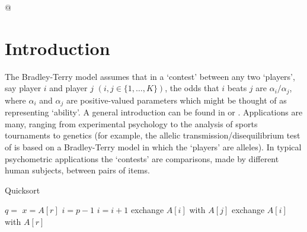 


@

\Rcodeplaceholder{}


\section{Introduction}

The Bradley-Terry model \citep{brad:terr:52} assumes that in a `contest' between
any two `players', say player $i$ and player $j$ $(i, j \in \{1,\ldots,K\})$,
the odds that $i$ beats $j$ are $\alpha_i/\alpha_j$, where $\alpha_i$ and
$\alpha_j$ are positive-valued parameters which might be thought of as
representing `ability'.  A general introduction can be found in
\citet{brad:84} or \citet{agre:02}.
Applications are many, ranging from experimental psychology to the analysis of
sports tournaments to genetics (for example, the allelic
transmission/disequilibrium test of \citealp{sham:curt:95} is based on a
Bradley-Terry model in which the `players' are alleles).
In typical
psychometric applications the `contests' are comparisons, made by
different human subjects, between pairs of items.

\begin{algorithm}
\caption{Quicksort}
\begin{algorithmic}
        \STATE $q = $ 
        \STATE {}
        \STATE {}
    \ENDIF
\ENDPROCEDURE
{}
    \STATE $x = A[r]$
    \STATE $i = p - 1$
            \STATE $i = i + 1$
            \STATE exchange
            $A[i]$ with $A[j]$
        \ENDIF
        \STATE exchange $A[i]$ with $A[r]$
    \ENDFOR
\ENDPROCEDURE
\end{algorithmic}
\end{algorithm}

